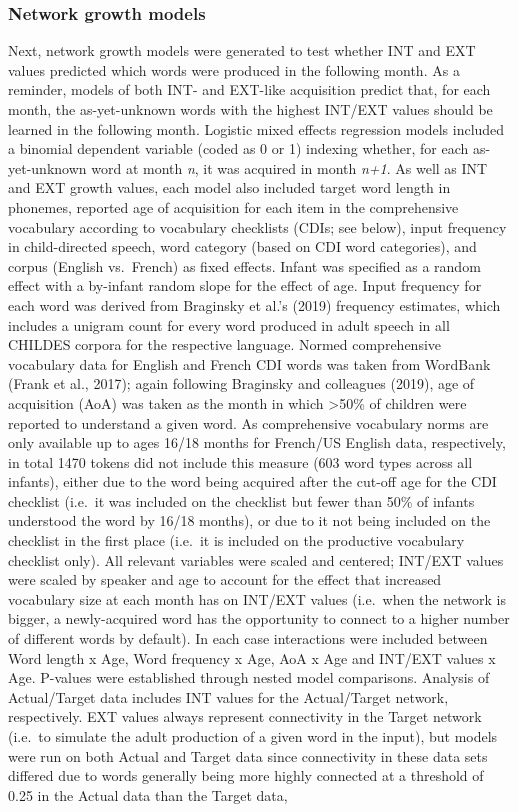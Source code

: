 \documentclass[
  man]{apa6}
\begin{document}
\hypertarget{network-growth-models-1}{%
\subsubsection{Network growth models}\label{network-growth-models-1}}

Next, network growth models were generated to test whether INT and EXT values predicted which words were produced in the following month. As a reminder, models of both INT- and EXT-like acquisition predict that, for each month, the as-yet-unknown words with the highest INT/EXT values should be learned in the following month.
Logistic mixed effects regression models included a binomial dependent variable (coded as 0 or 1) indexing whether, for each as-yet-unknown word at month \emph{n}, it was acquired in month \emph{n+1}. As well as INT and EXT growth values, each model also included target word length in phonemes, reported age of acquisition for each item in the comprehensive vocabulary according to vocabulary checklists (CDIs; see below), input frequency in child-directed speech, word category (based on CDI word categories), and corpus (English vs.~French) as fixed effects. Infant was specified as a random effect with a by-infant random slope for the effect of age. Input frequency for each word was derived from Braginsky et al.'s (2019) frequency estimates, which includes a unigram count for every word produced in adult speech in all CHILDES corpora for the respective language. Normed comprehensive vocabulary data for English and French CDI words was taken from WordBank (Frank et al., 2017); again following Braginsky and colleagues (2019), age of acquisition (AoA) was taken as the month in which \textgreater50\% of children were reported to understand a given word. As comprehensive vocabulary norms are only available up to ages 16/18 months for French/US English data, respectively, in total 1470 tokens did not include this measure (603 word types across all infants), either due to the word being acquired after the cut-off age for the CDI checklist (i.e.~it was included on the checklist but fewer than 50\% of infants understood the word by 16/18 months), or due to it not being included on the checklist in the first place (i.e.~it is included on the productive vocabulary checklist only). All relevant variables were scaled and centered; INT/EXT values were scaled by speaker and age to account for the effect that increased vocabulary size at each month has on INT/EXT values (i.e.~when the network is bigger, a newly-acquired word has the opportunity to connect to a higher number of different words by default). In each case interactions were included between Word length x Age, Word frequency x Age, AoA x Age and INT/EXT values x Age. P-values were established through nested model comparisons. Analysis of Actual/Target data includes INT values for the Actual/Target network, respectively. EXT values always represent connectivity in the Target network (i.e.~to simulate the adult production of a given word in the input), but models were run on both Actual and Target data since connectivity in these data sets differed due to words generally being more highly connected at a threshold of 0.25 in the Actual data than the Target data, 
\end{document}
